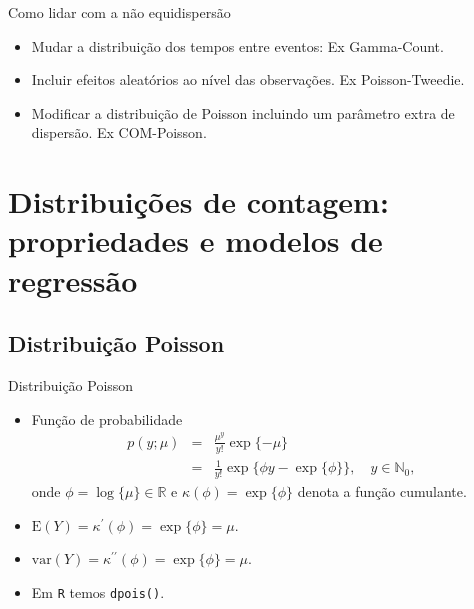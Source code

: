 \documentclass[10pt, aspectratio=169]{beamer}\usepackage[]{graphicx}\usepackage[]{color}
\begin{document}
\begin{frame}{Como lidar com a não equidispersão}
\begin{itemize}
\item Mudar a distribuição dos tempos entre eventos: Ex Gamma-Count. 
\vspace{0,5cm}
\item Incluir efeitos aleatórios ao nível das observações. Ex Poisson-Tweedie.
\vspace{0,5cm}
\item Modificar a distribuição de Poisson incluindo um parâmetro extra
de dispersão. Ex COM-Poisson.
\end{itemize}
\end{frame}

\section{Distribuições de contagem: propriedades e modelos de regressão}
\label{Section2}




\subsection{Distribuição Poisson}

\begin{frame}{Distribuição Poisson}
\begin{itemize}
\item Função de probabilidade
\begin{eqnarray}
p(y;\mu) &=& \frac{\mu^y}{y!}\exp\{-\mu\} \nonumber \\
	     &=& \frac{1}{y!} \exp \{\phi y -  \exp\{\phi\} \}, \quad y \in \mathbb{N}_{0},
\end{eqnarray}
onde $\phi = \log \{\mu\} \in \mathbb{R}$ e $\kappa(\phi) = \exp\{\phi\}$
denota a função cumulante.
\vspace{0,5cm}
\item $\mathrm{E}(Y) = \kappa^{\prime}(\phi) = \exp\{\phi\} = \mu$. 
\vspace{0,5cm}
\item $\mathrm{var}(Y) = \kappa^{\prime \prime}(\phi) = \exp\{\phi\} = \mu$.
\vspace{0,5cm}
\item Em \texttt{R} temos \texttt{dpois()}.

\end{itemize}
\end{frame}
\end{document}
